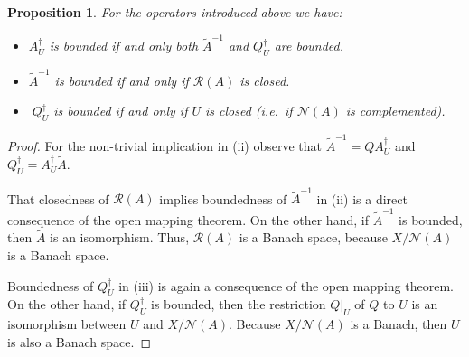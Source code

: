 \documentclass[12pt,twoside,reqno]{amsart}
\newtheorem{proposition}[theorem]{Proposition}
\theoremstyle{definition}
\numberwithin{equation}{section}
\begin{document}
\begin{proposition}\label{pro:appendix}
For the operators introduced above we have:
\begin{itemize}
\item[(i)]
$A_U^\dagger$ is bounded if and only both $\tilde{A}^{-1}$ and $Q_U^\dagger$ are bounded.
\item[(ii)]
$\tilde{A}^{-1}$ is bounded if and only if $\mathcal{R}(A)$ is closed.
\item[(iii)]
$\;Q_U^\dagger$ is bounded if and only if $U$ is closed (i.e.~if $\mathcal{N}(A)$ is complemented).
\end{itemize}
\end{proposition}

\begin{proof}
For the non-trivial implication in (ii) observe that $\tilde{A}^{-1}=QA_U^\dagger$ and $Q_U^\dagger=A_U^\dagger\tilde{A}$.
\par
That closedness of $\mathcal{R}(A)$ implies boundedness of $\tilde{A}^{-1}$ in (ii) is a direct consequence of the open mapping theorem. On the other hand, if $\tilde{A}^{-1}$ is bounded, then $\tilde{A}$ is an isomorphism. Thus, $\mathcal{R}(A)$ is a Banach space, because $X/\mathcal{N}(A)$ is a Banach space.
\par
Boundedness of $Q_U^\dagger$ in (iii) is again a consequence of the open mapping theorem. On the other hand, if $Q_U^\dagger$ is bounded, then the restriction $Q|_U$ of $Q$ to $U$ is an isomorphism between $U$ and $X/\mathcal{N}(A)$. Because $X/\mathcal{N}(A)$ is a Banach, then $U$ is also a Banach space.
\end{proof}
\end{document}

